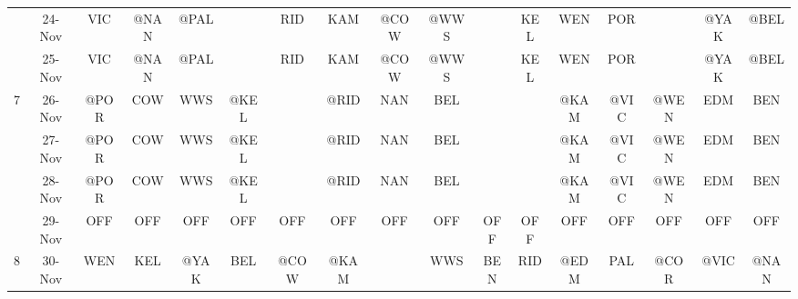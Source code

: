 \begin{table}[htbp]
\begin{tabular}{ccrrrrrrrrrrrrrrr}
          & 24-Nov & \multicolumn{1}{c}{VIC} & \multicolumn{1}{c}{@NAN} & \multicolumn{1}{c}{@PAL} &       & \multicolumn{1}{c}{RID} & \multicolumn{1}{c}{KAM} & \multicolumn{1}{c}{@COW} & \multicolumn{1}{c}{@WWS} &       & \multicolumn{1}{c}{KEL} & \multicolumn{1}{c}{WEN} & \multicolumn{1}{c}{POR} &       & \multicolumn{1}{c}{@YAK} & \multicolumn{1}{c}{@BEL} \\
          & 25-Nov & \multicolumn{1}{c}{VIC} & \multicolumn{1}{c}{@NAN} & \multicolumn{1}{c}{@PAL} &       & \multicolumn{1}{c}{RID} & \multicolumn{1}{c}{KAM} & \multicolumn{1}{c}{@COW} & \multicolumn{1}{c}{@WWS} &       & \multicolumn{1}{c}{KEL} & \multicolumn{1}{c}{WEN} & \multicolumn{1}{c}{POR} &       & \multicolumn{1}{c}{@YAK} & \multicolumn{1}{c}{@BEL} \\
    7     & 26-Nov & \multicolumn{1}{c}{@POR} & \multicolumn{1}{c}{COW} & \multicolumn{1}{c}{WWS} & \multicolumn{1}{c}{@KEL} &       & \multicolumn{1}{c}{@RID} & \multicolumn{1}{c}{NAN} & \multicolumn{1}{c}{BEL} &       &       & \multicolumn{1}{c}{@KAM} & \multicolumn{1}{c}{@VIC} & \multicolumn{1}{c}{@WEN} & \multicolumn{1}{c}{EDM} & \multicolumn{1}{c}{BEN} \\
          & 27-Nov & \multicolumn{1}{c}{@POR} & \multicolumn{1}{c}{COW} & \multicolumn{1}{c}{WWS} & \multicolumn{1}{c}{@KEL} &       & \multicolumn{1}{c}{@RID} & \multicolumn{1}{c}{NAN} & \multicolumn{1}{c}{BEL} &       &       & \multicolumn{1}{c}{@KAM} & \multicolumn{1}{c}{@VIC} & \multicolumn{1}{c}{@WEN} & \multicolumn{1}{c}{EDM} & \multicolumn{1}{c}{BEN} \\
          & 28-Nov & \multicolumn{1}{c}{@POR} & \multicolumn{1}{c}{COW} & \multicolumn{1}{c}{WWS} & \multicolumn{1}{c}{@KEL} &       & \multicolumn{1}{c}{@RID} & \multicolumn{1}{c}{NAN} & \multicolumn{1}{c}{BEL} &       &       & \multicolumn{1}{c}{@KAM} & \multicolumn{1}{c}{@VIC} & \multicolumn{1}{c}{@WEN} & \multicolumn{1}{c}{EDM} & \multicolumn{1}{c}{BEN} \\
          & 29-Nov & \multicolumn{1}{c}{OFF} & \multicolumn{1}{c}{OFF} & \multicolumn{1}{c}{OFF} & \multicolumn{1}{c}{OFF} & \multicolumn{1}{c}{OFF} & \multicolumn{1}{c}{OFF} & \multicolumn{1}{c}{OFF} & \multicolumn{1}{c}{OFF} & \multicolumn{1}{c}{OFF} & \multicolumn{1}{c}{OFF} & \multicolumn{1}{c}{OFF} & \multicolumn{1}{c}{OFF} & \multicolumn{1}{c}{OFF} & \multicolumn{1}{c}{OFF} & \multicolumn{1}{c}{OFF} \\
    8     & 30-Nov & \multicolumn{1}{c}{WEN} & \multicolumn{1}{c}{KEL} & \multicolumn{1}{c}{@YAK} & \multicolumn{1}{c}{BEL} & \multicolumn{1}{c}{\cellcolor[rgb]{ .588,  .588,  .588}@COW} & \multicolumn{1}{c}{@KAM} &       & \multicolumn{1}{c}{\cellcolor[rgb]{ 1,  .6,  .8}WWS} & \multicolumn{1}{c}{BEN} & \multicolumn{1}{c}{\cellcolor[rgb]{ 1,  .6,  .8}RID} & \multicolumn{1}{c}{@EDM} & \multicolumn{1}{c}{PAL} & \multicolumn{1}{c}{@COR} & \multicolumn{1}{c}{\cellcolor[rgb]{ .588,  .588,  .588}@VIC} & \multicolumn{1}{c}{@NAN} \\

\end{tabular}
\end{table}
